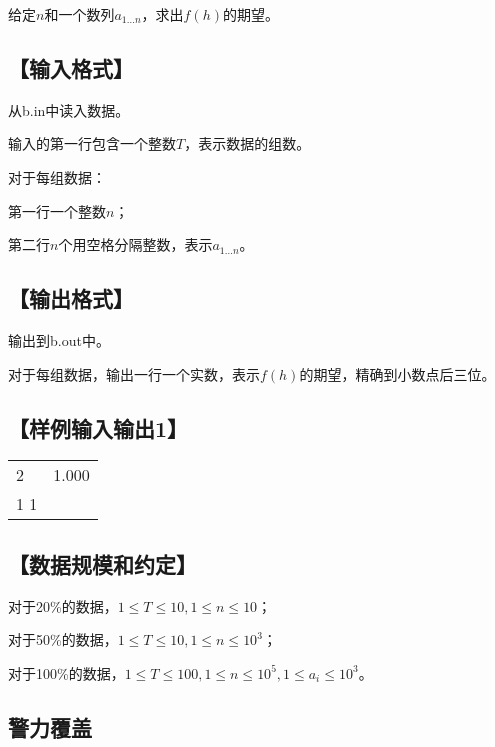 \documentclass{article}
\begin{document}
			给定\(n\)和一个数列\(a_{1\ldots n}\)，求出\(f(h)\)的期望。

		\subsection*{【输入格式】}

			从b.in中读入数据。

			输入的第一行包含一个整数\(T\)，表示数据的组数。

			对于每组数据：
			
			第一行一个整数\(n\)；

			第二行\(n\)个用空格分隔整数，表示\(a_{1\ldots n}\)。

		\subsection*{【输出格式】}

			输出到b.out中。

			对于每组数据，输出一行一个实数，表示\(f(h)\)的期望，精确到小数点后三位。
		
		\subsection*{【样例输入输出1】}

		\begin{table}[htbp]
		\centering
		\begin{tabular}{p{240pt}<{\raggedright}|p{240pt}<{\raggedright}}
			\hline
			2 & 1.000 \\
			1 1 \\
			\hline
		\end{tabular}
		\end{table}

		\subsection*{【数据规模和约定】}

		对于20\%的数据，\(1\leq T\leq 10,1\leq n\leq 10\)；

		对于50\%的数据，\(1\leq T\leq 10,1\leq n\leq 10^3\)；

		对于100\%的数据，\(1\leq T\leq 100,1\leq n\leq 10^5,1\leq a_i\leq 10^3\)。

	\newpage

	\begin{center}
		\section{警力覆盖}
	\end{center}
\end{document}
